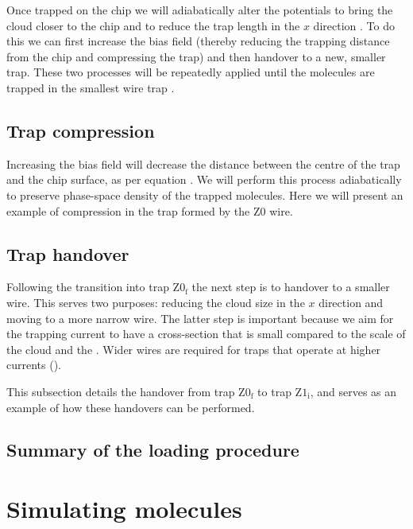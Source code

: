 Once trapped on the chip we will adiabatically alter the potentials to bring
the cloud closer to the chip and to reduce the trap length in the $x$ direction
. To do this we can first increase the bias field (thereby
reducing the trapping distance from the chip and compressing the trap) and then
handover to a new, smaller trap. These two processes will be repeatedly applied
until the molecules are trapped in the smallest wire trap .

\subsection{Trap compression}

Increasing the bias field will decrease the distance between the centre of the
trap and the chip surface, as per equation . We will
perform this process adiabatically to preserve phase-space density of the
trapped molecules. Here we will present an example of compression in the trap
formed by the $\mathrm{Z0}$ wire.


\subsection{Trap handover}

Following the transition into trap $\mathrm{Z0_f}$ the next step is to handover
to a smaller wire. This serves two purposes: reducing the cloud size in the $x$
direction and moving to a more narrow wire. The latter step is important
because we aim for the trapping current to have a cross-section that is small
compared to the scale of the cloud and the . Wider wires
are required for traps that operate at higher currents ().

This subsection details the handover from trap $\mathrm{Z0_f}$ to trap
$\mathrm{Z1_i}$, and serves as an example of how these handovers can be
performed.


\subsection{Summary of the loading procedure}

\section{Simulating molecules}
\label{design:sim}

